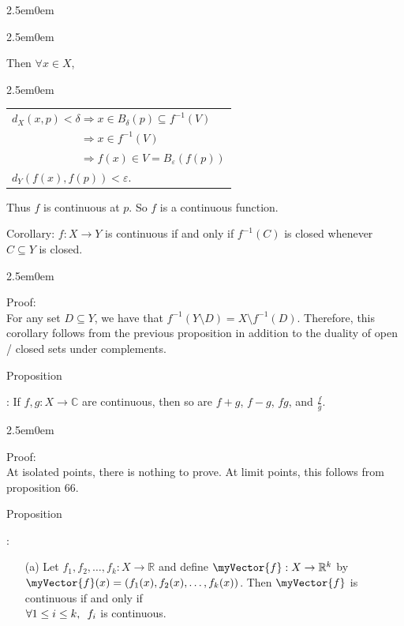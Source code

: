 \documentclass{book}
\newcommand{\hThree}{%
   \color{PineGreen}
   \fontsize{13}{15}\selectfont%
}
\newenvironment{myIndent}{%
   \begin{adjustwidth}{2.5em}{0em}%
}{%
   \end{adjustwidth}%
}
\newcommand{\retTwo}{\hfill\bigbreak}
\newcommand{\myHS}{ \hspace{0.5em}}
\newcounter{PropNumber}
\newcommand{\propCount}[1][1]{%
   \addtocounter{PropNumber}{#1}%
   \thePropNumber%
}
\newcommand{\mVec}[1]{\myVector{#1}}
\begin{document}
{\begin{myIndent}
{\begin{myIndent}
         \newpage

         Then $\forall x \in X$,\\
         \begin{myIndent}
            \begin{tabular}{l}
               $d_X(x, p) < \delta \Longrightarrow x \in B_\delta(p) \subseteq f^{-1}(V)$ \\
               $\phantom{d_X(x, p) < \delta } \Longrightarrow x \in f^{-1}(V)$ \\
               $\phantom{d_X(x, p) < \delta } \Longrightarrow f(x) \in V = B_\varepsilon(f(p))$ \\
               $d_Y(f(x), f(p)) < \varepsilon$. \retTwo
            \end{tabular}
         \end{myIndent}
         Thus $f$ is continuous at $p$. So $f$ is a continuous function. \retTwo
      \end{myIndent}}

      Corollary: $f: X \rightarrow Y$ is continuous if and only if $f^{-1}(C)$ is closed whenever $C \subseteq Y$ is closed.
      
      {\begin{myIndent} \hThree
         Proof:\\
         For any set $D \subseteq Y$, we have that $f^{-1}(Y \setminus D) = X \setminus f^{-1}(D)$. Therefore, this corollary follows from the previous proposition in addition to the duality of open / closed sets under complements. \retTwo \retTwo
      \end{myIndent}}

      Proposition \propCount: If $f, g: X \rightarrow \mathbb{C}$ are continuous, then so are $f + g$, $f - g$, $fg$, and $\frac{f}{g}$.
      
      {\begin{myIndent} \hThree
         Proof:\\
         At isolated points, there is nothing to prove. At limit points, this follows from proposition 66. \retTwo \retTwo
      \end{myIndent}}

      Proposition \propCount:
      \begin{itemize}
         \item[(a)] Let $f_1, f_2, \ldots, f_k: X \rightarrow \mathbb{R}$ and define $\mVec{f} : X \rightarrow \mathbb{R}^k$ by\\ $\mVec{f}(x) = (f_1(x), f_2(x), \ldots, f_k(x))$. Then $\mVec{f}$ is continuous if and only if\\ $\forall 1 \leq i \leq k, \myHS f_i$ is continuous.
         

\end{itemize}
\end{myIndent}}
\end{document}
